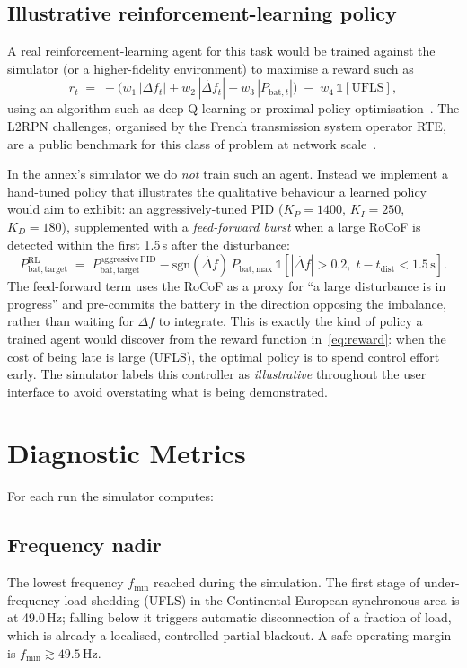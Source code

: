\documentclass[conference]{IEEEtran}
\begin{document}
\subsection{Illustrative reinforcement-learning policy}\label{sec:rl}
A real reinforcement-learning agent for this task would be trained against the simulator (or a higher-fidelity environment) to maximise a reward such as
\begin{equation}
r_t \;=\; -\bigl(w_1\,|\Delta f_t| + w_2\,|\dot{\Delta f}_t| + w_3\,|P_{\mathrm{bat},t}|\bigr) \;-\; w_4\,\mathbb{1}\!\left[\text{UFLS}\right],
\label{eq:reward}
\end{equation}
using an algorithm such as deep Q-learning or proximal policy optimisation~\cite{glavic2017rl}. The L2RPN challenges, organised by the French transmission system operator RTE, are a public benchmark for this class of problem at network scale~\cite{marot2020l2rpn}.

In the annex's simulator we do \emph{not} train such an agent. Instead we implement a hand-tuned policy that illustrates the qualitative behaviour a learned policy would aim to exhibit: an aggressively-tuned PID ($K_P = 1400$, $K_I = 250$, $K_D = 180$), supplemented with a \emph{feed-forward burst} when a large RoCoF is detected within the first 1.5\,s after the disturbance:
\begin{equation}
P_{\mathrm{bat,target}}^{\mathrm{RL}} \;=\; P_{\mathrm{bat,target}}^{\mathrm{aggressive\,PID}} - \mathrm{sgn}(\dot{\Delta f})\,P_{\mathrm{bat,max}}\,\mathbb{1}\!\left[|\dot{\Delta f}| > 0.2,\; t - t_{\mathrm{dist}} < 1.5\,\text{s}\right].
\label{eq:rl}
\end{equation}
The feed-forward term uses the RoCoF as a proxy for ``a large disturbance is in progress'' and pre-commits the battery in the direction opposing the imbalance, rather than waiting for $\Delta f$ to integrate. This is exactly the kind of policy a trained agent would discover from the reward function in~\eqref{eq:reward}: when the cost of being late is large (UFLS), the optimal policy is to spend control effort early. The simulator labels this controller as \emph{illustrative} throughout the user interface to avoid overstating what is being demonstrated.

\section{Diagnostic Metrics}\label{sec:metrics}
For each run the simulator computes:

\subsection{Frequency nadir}
The lowest frequency $f_{\min}$ reached during the simulation. The first stage of under-frequency load shedding (UFLS) in the Continental European synchronous area is at 49.0\,Hz; falling below it triggers automatic disconnection of a fraction of load, which is already a localised, controlled partial blackout. A safe operating margin is $f_{\min} \gtrsim 49.5$\,Hz.
\end{document}
